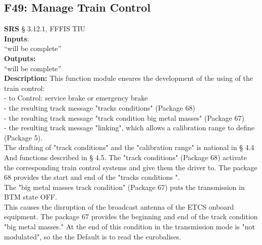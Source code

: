 \documentclass{template/openetcs_report}
\begin{document}
\subsection {F49: Manage Train Control}
\textbf{SRS} § 3.12.1, FFFIS TIU\\

\textbf{Inputs}:\\
``will be complete''\\
 
 \textbf{Outputs:}\\
 ``will be complete''\\
 
 \textbf{Description:} 
This function module ensures the development of the using of the train control: \\

- to Control: service brake or emergency brake\\

- the resulting track message "tracks conditions" (Package 68) \\

- the resulting track message "track condition big metal masses" (Package 67) \\

- the resulting track message "linking", which allows a calibration range to 
define (Package 5). \\

The drafting of "track conditions" and the "calibration range" is national in § 4.4 
And functions described in § 4.5. The "track conditions" (Package 68) activate the corresponding train control systems and give them 
the driver to. The package 68 provides the start and end of the "tracks 
conditions ". \\
The "big metal masses track condition" (Package 67) puts the transmission in BTM state 
OFF. \\
This causes the disruption of the broadcast antenna of the ETCS onboard equipment. 
The package 67 provides the beginning and end of the track condition "big metal masses." 
At the end of this condition in the transmission mode is "not modulated", so the the 
Default is to read the eurobalises. \\
\end{document}
